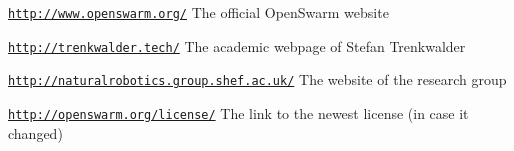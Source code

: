 \begin{DoxyItemize}
\item \href{http://www.openswarm.org/}{\tt http\+://www.\+openswarm.\+org/} The official Open\+Swarm website
\item \href{http://trenkwalder.tech/}{\tt http\+://trenkwalder.\+tech/} The academic webpage of Stefan Trenkwalder
\item \href{http://naturalrobotics.group.shef.ac.uk/}{\tt http\+://naturalrobotics.\+group.\+shef.\+ac.\+uk/} The website of the research group
\item \href{http://openswarm.org/license/}{\tt http\+://openswarm.\+org/license/} The link to the newest license (in case it changed) 
\end{DoxyItemize}